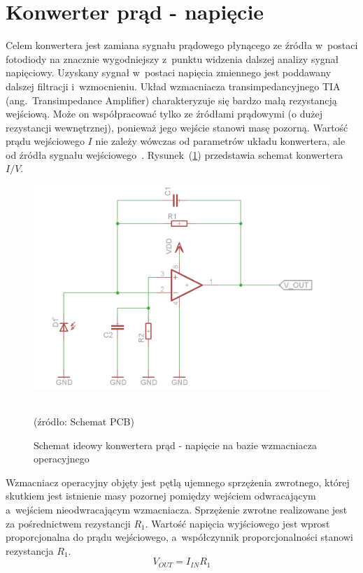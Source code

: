 \section{Konwerter prąd - napięcie}
\label{sec:LedSterownik}

Celem konwertera jest zamiana sygnału prądowego płynącego ze źródła w~postaci fotodiody na znacznie wygodniejszy z~punktu widzenia dalszej analizy sygnał napięciowy. Uzyskany sygnał w~postaci napięcia 
zmiennego jest poddawany dalszej filtracji i~wzmocnieniu. 
Układ wzmacniacza transimpedancyjnego TIA (ang.~Transimpedance Amplifier) charakteryzuje się bardzo małą rezystancją wejściową. Może on współpracować tylko ze źródłami prądowymi (o dużej rezystancji wewnętrznej), 
ponieważ jego wejście stanowi masę pozorną. 
Wartość prądu wejściowego $I$ nie zależy wówczas od parametrów układu konwertera, ale od źródła sygnału wejściowego~\cite{Rako}. Rysunek~(\ref{rys:IU}) przedstawia schemat konwertera $I/V$.
\begin{figure}[ht]
	\centerline{\includegraphics[scale = 0.42]{graphic/IU}}
	\caption{Schemat ideowy konwertera prąd - napięcie na bazie wzmacniacza operacyjnego}
	~\\
	(źródło: Schemat PCB)
	\label{rys:IU}
\end{figure}

Wzmacniacz operacyjny objęty jest pętlą ujemnego sprzężenia zwrotnego, której skutkiem jest istnienie masy pozornej pomiędzy wejściem odwracającym a~wejściem nieodwracającym wzmacniacza. 
Sprzężenie zwrotne realizowane jest za pośrednictwem rezystancji $R_{1}$. Wartość napięcia wyjściowego jest wprost proporcjonalna do prądu wejściowego, a~współczynnik proporcjonalności stanowi rezystancja $R_{1}$.
\begin{equation}
\label{equ:IU}
	V_{OUT} = I_{IN}R_{1}	
\end{equation}

